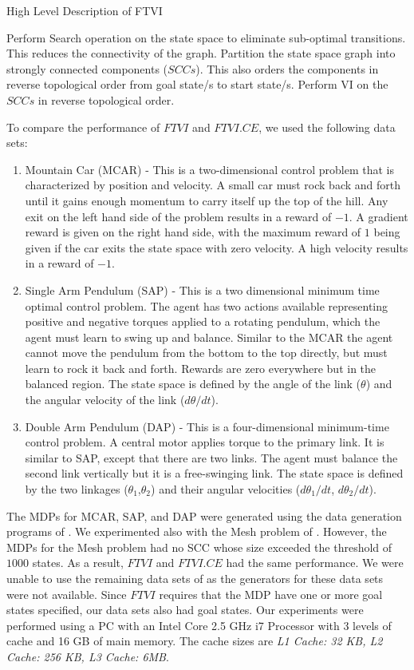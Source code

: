 \documentclass[conference]{IEEEtran}
\begin{document}
\begin{algorithm}[h]
\caption{High Level Description of FTVI}
\label{alg:FTVI}
\begin{algorithmic}[1]
\State Perform Search operation on the state space to eliminate sub-optimal transitions. This reduces the connectivity of the graph.
\State Partition the state space graph into strongly connected components ($SCCs$). This also  orders the components in reverse topological order from goal state/s to start state/s.
\State Perform VI on the $SCCs$ in reverse topological order.
\end{algorithmic}
\end{algorithm}

To compare the performance of $FTVI$ and $FTVI.CE$, we used the following data sets:
\begin{enumerate}
\item Mountain Car (MCAR) - This is a two-dimensional control problem that is characterized by position and velocity. A small car must rock back and forth until it gains enough momentum to carry itself up the top of the hill. Any exit on the left hand side of the problem results in a reward of $-1$. A gradient reward is given on the right hand side, with the maximum reward of $1$ being given if the car exits the state space with zero velocity. A high velocity results in a reward of $-1$. 
\item Single Arm Pendulum (SAP) -  This is a two dimensional minimum time optimal control problem. The agent has two actions available representing positive and negative torques applied to a rotating pendulum, which the agent must learn to swing up and balance. Similar to the MCAR the agent cannot move the pendulum from the bottom to the top directly, but must learn to rock it back and forth. Rewards are zero everywhere but in the balanced region. The state space is defined by the angle of the link ($\theta$) and the angular velocity of the link ($d\theta/dt$). 
\item Double Arm Pendulum (DAP) - This is a four-dimensional minimum-time control problem. A central motor applies torque to the primary link. It is similar to SAP, except that there are two links. The agent must balance the second link vertically but it is a free-swinging link. The state space is defined by the two linkages ($\theta_{1}$,$\theta_{2}$) and their angular velocities ($d\theta_{1}/dt$, $d\theta_{2}/dt$).
\end{enumerate}

The MDPs for MCAR, SAP, and DAP were generated using the data generation programs of \cite{b11}. We experimented also with the Mesh problem of \cite{b11}. However, the MDPs for the Mesh problem had no SCC whose size exceeded the threshold of $1000$ states. As a result, $FTVI$ and $FTVI.CE$ had the same performance. We were unable to use the remaining data sets of \cite{b10} as the generators for these data sets were not available.
Since $FTVI$ requires that the MDP have one or more goal states specified, our data sets also had goal states.
Our experiments were performed using a
PC with an Intel Core 2.5 GHz i7 Processor with 3 levels of cache and 16 GB of main memory.
The cache sizes are \textit{L1 Cache: 32 KB, L2 Cache: 256 KB, L3 Cache: 6MB}.
\end{document}
